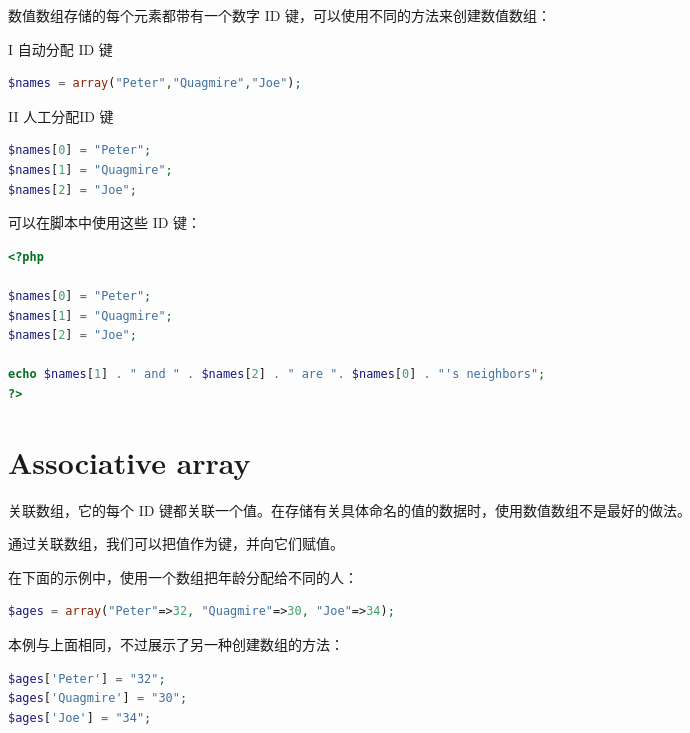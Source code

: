 数值数组存储的每个元素都带有一个数字 ID 键，可以使用不同的方法来创建数值数组：

\begin{compactenum}
\item[I] 自动分配 ID 键

\begin{lstlisting}[language=PHP]
$names = array("Peter","Quagmire","Joe");
\end{lstlisting}

\item[II] 人工分配ID 键

\begin{lstlisting}[language=PHP]
$names[0] = "Peter";
$names[1] = "Quagmire";
$names[2] = "Joe";
\end{lstlisting}

可以在脚本中使用这些 ID 键：


\begin{lstlisting}[language=PHP]
<?php

$names[0] = "Peter";
$names[1] = "Quagmire";
$names[2] = "Joe";

echo $names[1] . " and " . $names[2] . " are ". $names[0] . "'s neighbors";
?>
\end{lstlisting}


\end{compactenum}





\section{Associative array}


关联数组，它的每个 ID 键都关联一个值。在存储有关具体命名的值的数据时，使用数值数组不是最好的做法。

通过关联数组，我们可以把值作为键，并向它们赋值。

在下面的示例中，使用一个数组把年龄分配给不同的人：


\begin{lstlisting}[language=PHP]
$ages = array("Peter"=>32, "Quagmire"=>30, "Joe"=>34);
\end{lstlisting}

本例与上面相同，不过展示了另一种创建数组的方法：

\begin{lstlisting}[language=PHP]
$ages['Peter'] = "32";
$ages['Quagmire'] = "30";
$ages['Joe'] = "34";
\end{lstlisting}



